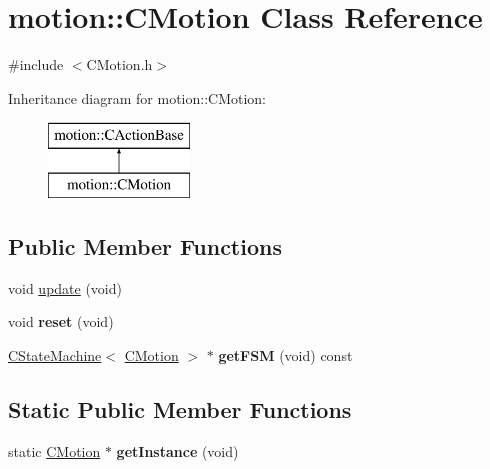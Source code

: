 \hypertarget{classmotion_1_1CMotion}{}\section{motion\+:\+:C\+Motion Class Reference}
\label{classmotion_1_1CMotion}


{\ttfamily \#include $<$C\+Motion.\+h$>$}

Inheritance diagram for motion\+:\+:C\+Motion\+:\begin{figure}[H]
\begin{center}
\leavevmode
\includegraphics[height=2.000000cm]{classmotion_1_1CMotion}
\end{center}
\end{figure}
\subsection*{Public Member Functions}
\begin{DoxyCompactItemize}
\item 
void \mbox{\hyperlink{classmotion_1_1CMotion_a7e4c27c99fca247140ff23e693be7e7a}{update}} (void)
\item 
\mbox{\label{classmotion_1_1CMotion_a95a158cf97317b99f614c726b398ff9e}} 
void {\bfseries reset} (void)
\item 
\mbox{\label{classmotion_1_1CMotion_a502c2ceefa31655ac88c786a969525ab}} 
\mbox{\hyperlink{classmotion_1_1CStateMachine}{C\+State\+Machine}}$<$ \mbox{\hyperlink{classmotion_1_1CMotion}{C\+Motion}} $>$ $\ast$ {\bfseries get\+F\+SM} (void) const
\end{DoxyCompactItemize}
\subsection*{Static Public Member Functions}
\begin{DoxyCompactItemize}
\item 
\mbox{\label{classmotion_1_1CMotion_ae4f9348f30ec8f233053761695adb5f6}} 
static \mbox{\hyperlink{classmotion_1_1CMotion}{C\+Motion}} $\ast$ {\bfseries get\+Instance} (void)
\end{DoxyCompactItemize}


